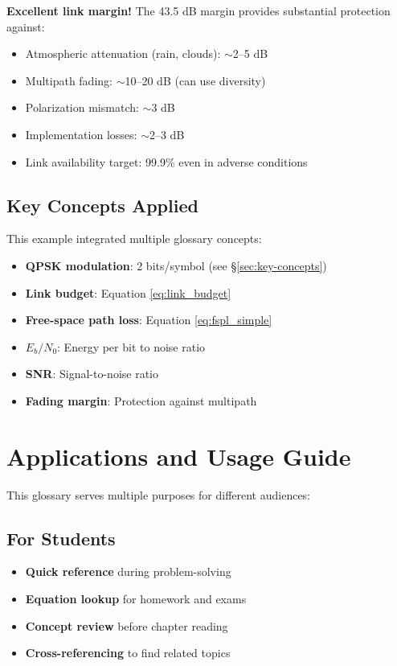 \begin{keyconcept}
\textbf{Excellent link margin!} The 43.5 dB margin provides substantial protection against:
\begin{itemize}
\item Atmospheric attenuation (rain, clouds): $\sim$2--5 dB
\item Multipath fading: $\sim$10--20 dB (can use diversity)
\item Polarization mismatch: $\sim$3 dB
\item Implementation losses: $\sim$2--3 dB
\item Link availability target: 99.9\% even in adverse conditions
\end{itemize}
\end{keyconcept}

\subsection*{Key Concepts Applied}
This example integrated multiple glossary concepts:
\begin{itemize}
\item \textbf{QPSK modulation}: 2 bits/symbol (see \S\ref{sec:key-concepts})
\item \textbf{Link budget}: Equation \eqref{eq:link_budget}
\item \textbf{Free-space path loss}: Equation \eqref{eq:fspl_simple}
\item \textbf{$E_b/N_0$}: Energy per bit to noise ratio
\item \textbf{SNR}: Signal-to-noise ratio
\item \textbf{Fading margin}: Protection against multipath
\end{itemize}

\section{Applications and Usage Guide}

This glossary serves multiple purposes for different audiences:

\subsection{For Students}
\begin{itemize}
\item \textbf{Quick reference} during problem-solving
\item \textbf{Equation lookup} for homework and exams
\item \textbf{Concept review} before chapter reading
\item \textbf{Cross-referencing} to find related topics
\end{itemize}

